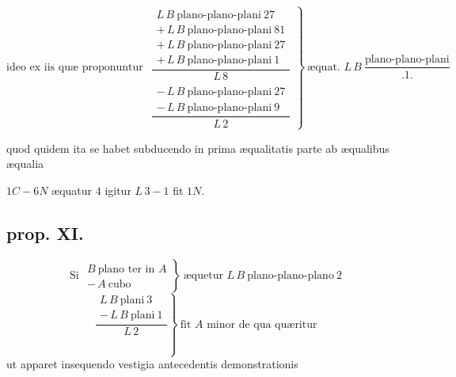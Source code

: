 \documentclass[11pt,a4paper]{article}
\begin{document}
\[ \text{ideo ex iis quæ proponuntur } \left.\begin{array}{l} \dfrac{\begin{array}{l} L\,B\ \text{plano-plano-plani}\ 27 \\ +\,L\,B\ \text{plano-plano-plani}\ 81 \\ +\,L\,B\ \text{plano-plano-plani}\ 27 \\ +\,L\,B\ \text{plano-plano-plani}\ 1 \end{array}}{L\,8} \\[4ex] \dfrac{\begin{array}{l} -\,L\,B\ \text{plano-plano-plani}\ 27 \\ -\,L\,B\ \text{plano-plano-plani}\ 9 \end{array}}{L\,2} \end{array}\right\}\ \text{æquat. } L\,B\ \dfrac{\text{plano-plano-plani}}{.1.} \]

quod quidem ita se habet subducendo in prima æqualitatis parte ab æqualibus æqualia

$1C - 6N$ æquatur $4$ igitur $L\,3 - 1$ fit $1N$.
\marginal{$\pm$}

\subsection*{prop. XI.}

\[ \text{Si } \left.\begin{array}{l} B\ \text{plano ter in } A \\ -\,A\ \text{cubo} \end{array}\right\}\ \text{æquetur } L\,B\ \text{plano-plano-plano}\ 2 \]
\[ \left.\dfrac{\begin{array}{l} L\,B\ \text{plani}\ 3 \\ -\,L\,B\ \text{plani}\ 1 \end{array}}{L\,2}\right\}\ \text{fit } A \text{ minor de qua quæritur} \]
ut apparet insequendo vestigia antecedentis demonstrationis
\end{document}
